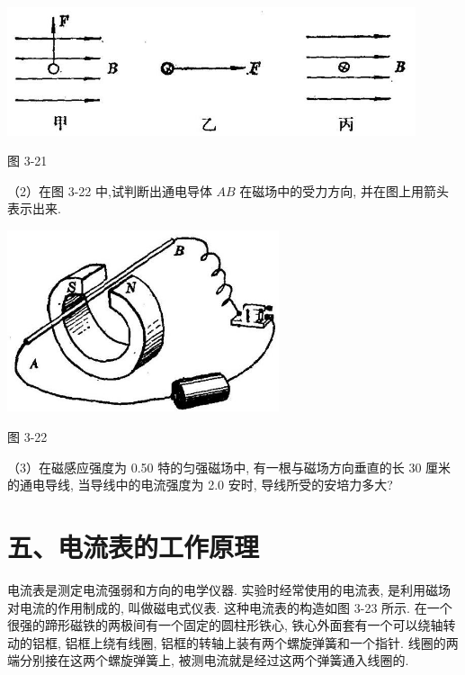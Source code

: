 \documentclass[10pt]{article}
\begin{document}
\begin{center}
\includegraphics[max width=0.9\textwidth]{images/01913056-1f15-74d8-9184-9aab52c9d66b_116_968499.jpg}
\end{center}

图 3-21

（2）在图 3-22 中,试判断出通电导体 \({AB}\) 在磁场中的受力方向, 并在图上用箭头表示出来.

\begin{center}
\includegraphics[max width=0.6\textwidth]{images/01913056-1f15-74d8-9184-9aab52c9d66b_116_892317.jpg}
\end{center}

图 3-22

（3）在磁感应强度为 0.50 特的匀强磁场中, 有一根与磁场方向垂直的长 30 厘米的通电导线, 当导线中的电流强度为 2.0 安时, 导线所受的安培力多大?

\section*{五、电流表的工作原理}

电流表是测定电流强弱和方向的电学仪器. 实验时经常使用的电流表, 是利用磁场对电流的作用制成的, 叫做磁电式仪表. 这种电流表的构造如图 3-23 所示. 在一个很强的蹄形磁铁的两极间有一个固定的圆柱形铁心, 铁心外面套有一个可以绕轴转动的铝框, 铝框上绕有线圈, 铝框的转轴上装有两个螺旋弹簧和一个指针. 线圈的两端分别接在这两个螺旋弹簧上, 被测电流就是经过这两个弹簧通入线圈的.
\end{document}
